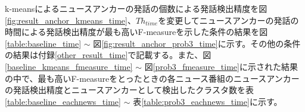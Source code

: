 \vspace{0.2in}\par
k-meansによるニュースアンカーの発話の個数による発話検出精度を図\ref{fig:result_anchor_kmeans_time}、$Th_{time}$を変更してニュースアンカーの発話の時間による発話検出精度が最も高いF-measureを示した条件の結果を図\ref{table:baseline_time} $\sim$ 図\ref{fig:result_anchor_prob3_time}に示す。その他の条件の結果は付録\ref{other_result_time}で記載する。また、図\ref{baseline_kmeans_fmeasure_time} $\sim$ 図\ref{prob3_fmeasure_time}に示された結果の中で、最も高いF-measureをとったときの各ニュース番組のニュースアンカーの発話検出精度とニュースアンカーとして検出したクラスタ数を表\ref{table:baseline_eachnews_time} $\sim$ 表\ref{table:prob3_eachnews_time}に示す。

